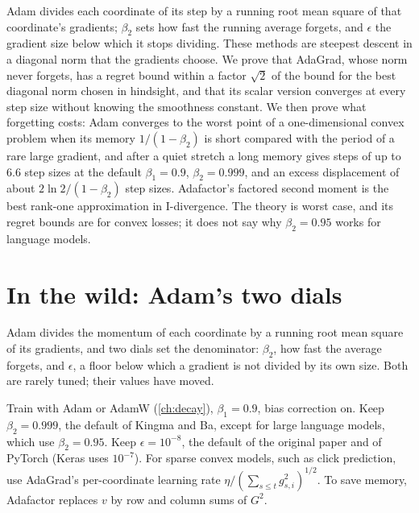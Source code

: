 \newcommand{\adaptiveclip}{\operatorname{clip}}
\newcommand{\adaptiveKL}{\operatorname{KL}}

\begin{refsection}

\begin{chaptersummary}
Adam divides each coordinate of its step by a running root mean square of that coordinate's gradients; $\beta_2$ sets how fast the running average forgets, and $\epsilon$ the gradient size below which it stops dividing. These methods are steepest descent in a diagonal norm that the gradients choose. We prove that AdaGrad, whose norm never forgets, has a regret bound within a factor $\sqrt2$ of the bound for the best diagonal norm chosen in hindsight, and that its scalar version converges at every step size without knowing the smoothness constant. We then prove what forgetting costs: Adam converges to the worst point of a one-dimensional convex problem when its memory $1/(1-\beta_2)$ is short compared with the period of a rare large gradient, and after a quiet stretch a long memory gives steps of up to $6.6$ step sizes at the default $\beta_1=0.9$, $\beta_2=0.999$, and an excess displacement of about $2\ln2/(1-\beta_2)$ step sizes. Adafactor's factored second moment is the best rank-one approximation in I-divergence. The theory is worst case, and its regret bounds are for convex losses; it does not say why $\beta_2=0.95$ works for language models.
\end{chaptersummary}

\section{In the wild: Adam's two dials}\label{sec:adaptive:wild}

Adam divides the momentum of each coordinate by a running root mean square of its gradients, and two dials set the denominator: $\beta_2$, how fast the average forgets, and $\epsilon$, a floor below which a gradient is not divided by its own size. Both are rarely tuned; their values have moved.

\begin{practice}
Train with Adam or AdamW (\cref{ch:decay}), $\beta_1=0.9$, bias correction on. Keep $\beta_2=0.999$, the default of Kingma and Ba, except for large language models, which use $\beta_2=0.95$. Keep $\epsilon=10^{-8}$, the default of the original paper and of PyTorch (Keras uses $10^{-7}$). For sparse convex models, such as click prediction, use AdaGrad's per-coordinate learning rate $\eta/(\sum_{s\le t}g_{s,i}^2)^{1/2}$. To save memory, Adafactor replaces $v$ by row and column sums of $G^2$.
\end{practice}


\end{refsection}
